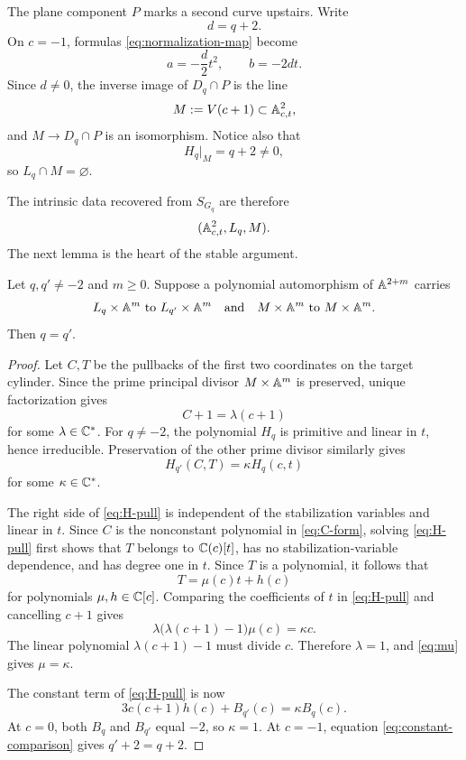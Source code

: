 \documentclass[11pt,reqno]{amsart}
\begin{document}
The plane component \(P\) marks a second curve upstairs.  Write
\[
d=q+2.
\]
On \(c=-1\), formulas \eqref{eq:normalization-map} become
\begin{equation}
\label{eq:M-map}
a=-\frac d2t^2,\qquad b=-2dt.
\end{equation}
Since \(d\ne0\), the inverse image of \(D_q\cap P\) is the line
\[
M:=V(c+1)\subset\mathbb A^2_{c,t},
\]
and \(M\to D_q\cap P\) is an isomorphism.  Notice also that
\[
H_q|_M=q+2\ne0,
\]
so \(L_q\cap M=\varnothing\).

The intrinsic data recovered from \(S_{G_q}\) are therefore
\begin{equation}
\label{eq:marked-pair}
(\mathbb A^2_{c,t},L_q,M).
\end{equation}
The next lemma is the heart of the stable argument.

\begin{lemma}
\label{lem:marked-rigidity}
Let \(q,q'\ne-2\) and \(m\ge0\).  Suppose a polynomial automorphism of
\(\mathbb A^{2+m}\) carries
\[
L_q\times\mathbb A^m\ \text{to}\ L_{q'}\times\mathbb A^m
\quad\text{and}\quad
M\times\mathbb A^m\ \text{to}\ M\times\mathbb A^m.
\]
Then \(q=q'\).
\end{lemma}

\begin{proof}
Let \(C,T\) be the pullbacks of the first two coordinates on the target
cylinder.  Since the prime principal divisor \(M\times\mathbb A^m\) is preserved,
unique factorization gives
\begin{equation}
\label{eq:C-form}
C+1=\lambda(c+1)
\end{equation}
for some \(\lambda\in\mathbb C^*\).  For \(q\ne-2\), the polynomial \(H_q\) is
primitive and linear in \(t\), hence irreducible.  Preservation of the other
prime divisor similarly gives
\begin{equation}
\label{eq:H-pull}
H_{q'}(C,T)=\kappa H_q(c,t)
\end{equation}
for some \(\kappa\in\mathbb C^*\).

The right side of \eqref{eq:H-pull} is independent of the stabilization
variables and linear in \(t\).  Since \(C\) is the nonconstant polynomial
in \eqref{eq:C-form}, solving \eqref{eq:H-pull} first shows that \(T\)
belongs to \(\mathbb C(c)[t]\), has no stabilization-variable dependence, and has
degree one in \(t\).  Since \(T\) is a polynomial, it follows that
\[
T=\mu(c)t+h(c)
\]
for polynomials \(\mu,h\in\mathbb C[c]\).  Comparing the coefficients of \(t\) in
\eqref{eq:H-pull} and cancelling \(c+1\) gives
\begin{equation}
\label{eq:mu}
\lambda\bigl(\lambda(c+1)-1\bigr)\mu(c)=\kappa c.
\end{equation}
The linear polynomial \(\lambda(c+1)-1\) must divide \(c\).  Therefore
\(\lambda=1\), and \eqref{eq:mu} gives \(\mu=\kappa\).

The constant term of \eqref{eq:H-pull} is now
\begin{equation}
\label{eq:constant-comparison}
3c(c+1)h(c)+B_{q'}(c)=\kappa B_q(c).
\end{equation}
At \(c=0\), both \(B_q\) and \(B_{q'}\) equal \(-2\), so
\(\kappa=1\).  At \(c=-1\), equation
\eqref{eq:constant-comparison} gives \(q'+2=q+2\).
\end{proof}
\end{document}
